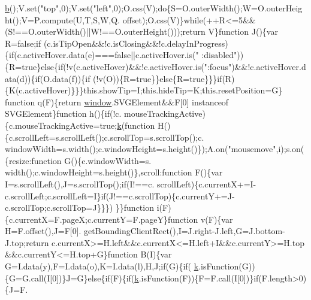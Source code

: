 \begin{DoxyCode}
      \hyperlink{jquery_8js_aa4026ad5544b958e54ce5e106fa1c805}{b}();V.set(\textcolor{stringliteral}{"top"},0);V.set(\textcolor{stringliteral}{"left"},0);O.css(V);\textcolor{keywordflow}{do}\{S=O.outerWidth();W=O.outerHeight();V=P.compute(U,T,S,W,Q.
      offset);O.css(V)\}\textcolor{keywordflow}{while}(++R<=5&&(S!==O.outerWidth()||W!==O.outerHeight()));\textcolor{keywordflow}{return} V\}\textcolor{keyword}{function} J()\{var R=\textcolor{keyword}{false};\textcolor{keywordflow}{if}
      (c.isTipOpen&&!c.isClosing&&!c.delayInProgress)\{\textcolor{keywordflow}{if}(c.activeHover.data(e)===\textcolor{keyword}{false}||c.activeHover.is(\textcolor{stringliteral}{"
      :disabled"}))\{R=\textcolor{keyword}{true}\}\textcolor{keywordflow}{else}\{\textcolor{keywordflow}{if}(!v(c.activeHover)&&!c.activeHover.is(\textcolor{stringliteral}{":focus"})&&!c.activeHover.data(d))\{\textcolor{keywordflow}{if}(O.data(f))\{\textcolor{keywordflow}{if}
      (!v(O))\{R=\textcolor{keyword}{true}\}\}\textcolor{keywordflow}{else}\{R=\textcolor{keyword}{true}\}\}\}\textcolor{keywordflow}{if}(R)\{K(c.activeHover)\}\}\}this.showTip=I;this.hideTip=K;this.resetPosition=G\}\textcolor{keyword}{
      function} q(F)\{\textcolor{keywordflow}{return} \hyperlink{jquery_8js_a04a8a2bbfa9c15500892b8e5033d625b}{window}.SVGElement&&F[0] instanceof SVGElement\}\textcolor{keyword}{function} h()\{\textcolor{keywordflow}{if}(!c.
      mouseTrackingActive)\{c.mouseTrackingActive=\textcolor{keyword}{true};\hyperlink{jquery_8js_ab26645c014aa005ecedef329ecf58c99}{k}(\textcolor{keyword}{function} H()\{c.scrollLeft=s.scrollLeft();c.scrollTop=s.scrollTop();c.
      windowWidth=s.width();c.windowHeight=s.height()\});A.on(\textcolor{stringliteral}{"mousemove"},i);s.on(\{resize:\textcolor{keyword}{function} G()\{c.windowWidth=s.
      width();c.windowHeight=s.height()\},scroll:\textcolor{keyword}{function} F()\{var I=s.scrollLeft(),J=s.scrollTop();\textcolor{keywordflow}{if}(I!==c.
      scrollLeft)\{c.currentX+=I-c.scrollLeft;c.scrollLeft=I\}\textcolor{keywordflow}{if}(J!==c.scrollTop)\{c.currentY+=J-c.scrollTop;c.scrollTop=J\}\}\})
      \}\}\textcolor{keyword}{function} i(F)\{c.currentX=F.pageX;c.currentY=F.pageY\}\textcolor{keyword}{function} v(F)\{var H=F.offset(),J=F[0].
      getBoundingClientRect(),I=J.right-J.left,G=J.bottom-J.top;\textcolor{keywordflow}{return} c.currentX>=H.left&&c.currentX<=H.left+I&&c.currentY>=H.top
      &&c.currentY<=H.top+G\}\textcolor{keyword}{function} B(I)\{var G=I.data(y),F=I.data(o),K=I.data(l),H,J;\textcolor{keywordflow}{if}(G)\{\textcolor{keywordflow}{if}(
      \hyperlink{jquery_8js_ab26645c014aa005ecedef329ecf58c99}{k}.isFunction(G))\{G=G.call(I[0])\}J=G\}\textcolor{keywordflow}{else}\{\textcolor{keywordflow}{if}(F)\{\textcolor{keywordflow}{if}(\hyperlink{jquery_8js_ab26645c014aa005ecedef329ecf58c99}{k}.isFunction(F))\{F=F.call(I[0])\}\textcolor{keywordflow}{if}(F.length>0)\{J=F.

\end{DoxyCode}
